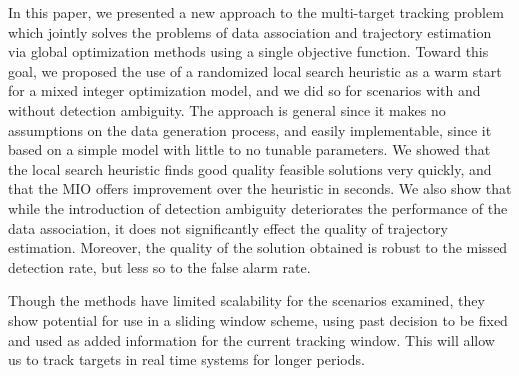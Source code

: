 In this paper, we presented a new approach to the multi-target tracking problem which jointly solves the problems of data association and trajectory estimation via global optimization methods using a single objective function. Toward this goal, we proposed the use of a randomized local search heuristic as a warm start for a mixed integer optimization model, and we did so for scenarios with and without detection ambiguity. The approach is general since it makes no assumptions on the data generation process, and easily implementable, since it based on a simple model with little to no tunable parameters. We showed that the local search heuristic finds good quality feasible solutions very quickly, and that the MIO offers improvement over the heuristic in seconds. We also show that while the introduction of detection ambiguity deteriorates the performance of the data association, it does not significantly effect the quality of trajectory estimation. Moreover, the quality of the solution obtained is robust to the missed detection rate, but less so to the false alarm rate.

Though the methods have limited scalability for the scenarios examined, they show potential for use in a sliding window scheme, using past decision to be fixed and used as added information for the current tracking window. This will allow us to track targets in real time systems for longer periods.  %

